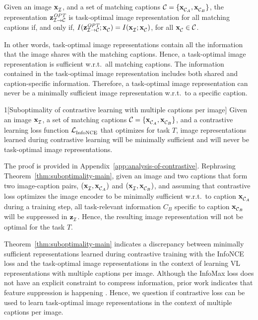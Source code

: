 \begin{definition}
	\label{def:opt_z}	
	Given an image $\mathbf{x}_{\mathcal{I}}^{}{}$, and a set of matching captions $\mathcal{C} = \{ \mathbf{x}_{\mathcal{C}_{A}}^{}, \mathbf{x}_{\mathcal{C}_{B}}^{} \}$, 
	the representation $\mathbf{z}_{\mathcal{I} \rightarrow \mathcal{C}}^{\textit{OPT}}{}$ is task-optimal image representation for all matching captions if, and only if, $I(\mathbf{z}_{\mathcal{I} \rightarrow \mathcal{C}}^{\textit{OPT}}{}; \mathbf{x}_{\mathcal{C}_{}}^{}) = I(\mathbf{x}_{\mathcal{I}}^{}{}; \mathbf{x}_{\mathcal{C}_{}}^{})$, for all $\mathbf{x}_{\mathcal{C}_{}}^{} \in \mathcal{C}$.
\end{definition}
In other words, task-optimal image representations contain all the information that the image shares with the matching captions. 
Hence, a task-optimal image representation is sufficient w.r.t.\ all matching captions. 
The information contained in the task-optimal image representation includes both shared and caption-specific information.
Therefore, a task-optimal image representation can never be a minimally sufficient image representation w.r.t.\ to a specific caption.

\begin{thm}{1}[Suboptimality of contrastive learning with multiple captions per image]
	\label{thm:suboptimality-main}	
	Given an image $\mathbf{x}_{\mathcal{I}}^{}{}$, a set of matching captions $\mathcal{C} = \{ \mathbf{x}_{\mathcal{C}_{A}}^{}, \mathbf{x}_{\mathcal{C}_{B}}^{} \}$, and a contrastive learning loss function $\mathcal{L}_{\text{InfoNCE}}^{}$ that optimizes for task $T$, 
	image representations learned during contrastive learning will be minimally sufficient and will never be task-optimal image representations.
\end{thm}

The proof is provided in Appendix~\ref{app:analysis-of-contrastive}.
Rephrasing Theorem~\ref{thm:suboptimality-main}, given an image and two captions that form two image-caption pairs, $(\mathbf{x}_{\mathcal{I}}^{}{}, \mathbf{x}_{\mathcal{C}_{A}}^{})$ and $(\mathbf{x}_{\mathcal{I}}^{}{}, \mathbf{x}_{\mathcal{C}_{B}}^{})$, and assuming that contrastive loss optimizes the image encoder to be minimally sufficient w.r.t.\ to caption $\mathbf{x}_{\mathcal{C}_{A}}^{}$ during a training step, all task-relevant information $C_{B}$ specific to caption $\mathbf{x}_{\mathcal{C}_{B}}^{}$ will be suppressed in $\mathbf{z}_{\mathcal{I}_{}}^{}$. Hence, the resulting image representation will not be optimal for the task $T$.

Theorem~\ref{thm:suboptimality-main} indicates a discrepancy between minimally sufficient representations learned during contrastive training with the InfoNCE loss and the task-optimal image representations in the context of learning \ac{VL} representations with multiple captions per image.
Although the InfoMax loss does not have an explicit constraint to compress information, prior work indicates that feature suppression is happening \citep{shwartz2023compress, robinson2021can}. 
Hence, we question if contrastive loss can be used to learn task-optimal image representations in the context of multiple captions per image.

